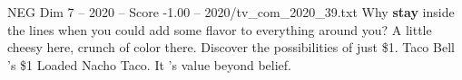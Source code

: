 \begin{textsample}{NEG Dim 7 – 2020 – Score -1.00 – 2020/tv\_com\_2020\_39.txt}  \label{ex:f7_neg_002}
Why \textbf{stay} inside the lines when you could add some flavor to everything around you?
A little cheesy here, crunch of color there.
Discover the possibilities of just \$1.
Taco Bell 's \$1 Loaded Nacho Taco.
It 's value beyond belief.

\end{textsample}
